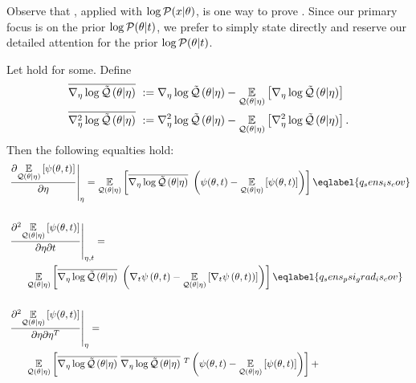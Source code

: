 Observe that , applied with $\log \mathcal{P}(x \vert \theta)$, is
one way to prove .  Since our primary focus
is on the prior $\log \mathcal{P}(\theta \vert t)$, we prefer to simply state
 directly and reserve our detailed attention
for the prior $\log \mathcal{P}(\theta \vert t)$.



\begin{lem}
%
Let  hold for some.  Define
%
\begin{align*}
%
\lqgradbar{\theta \vert \eta} :={}& \lqgrad{\theta \vert \eta}
  - \expect{\q(\theta \vert \eta)}{\lqgrad{\theta \vert \eta}} \\
\lqhessbar{\theta \vert \eta} :={}& \lqhess{\theta \vert \eta}
 - \expect{\q(\theta \vert \eta)}{\lqhess{\theta \vert \eta}}.
%
\end{align*}
%
Then the following equalties hold:
%
\begin{align}
%
\MoveEqLeft
\fracat{\partial \expect{\q(\theta \vert \eta)}
              {\psi(\theta, \t)}}{\partial \eta}{\eta} ={}
\expect{\q(\theta \vert \eta)}
       {\lqgradbar{\theta \vert \eta} \left(
        \psi(\theta,\t) - \expect{\q(\theta \vert \eta)}{\psi(\theta, \t)}
       \right)
       }\eqlabel{q_sens_is_cov}\\\nonumber\\
%
\MoveEqLeft
\fracat{\partial^2 \expect{\q(\theta \vert \eta)}
      {\psi(\theta, \t)}}{\partial \eta \partial \t}{\eta, \t} ={}\nonumber\\&
  \expect{\q(\theta \vert \eta)}
         {\lqgradbar{\theta \vert \eta} \left(
          \psigrad{\theta,\t} - \expect{\q(\theta \vert \eta)}{\psigrad{\theta, \t})}
         \right)
         } \eqlabel{q_sens_psi_grad_is_cov} \\\nonumber\\
 \MoveEqLeft
 \fracat{\partial^2 \expect{\q(\theta \vert \eta)}
       {\psi(\theta, \t)}}{\partial \eta \partial \eta^T}{\eta} ={}
 \nonumber\\&
 \expect{\q(\theta \vert \eta)}
        {\lqgradbar{\theta \vert \eta} \lqgradbar{\theta \vert \eta}^T
        \left(
         \psi(\theta,\t) - \expect{\q(\theta \vert \eta)}{\psi(\theta, \t)}
        \right)
        } +
 \nonumber\\ &

\end{align}
\end{lem}
